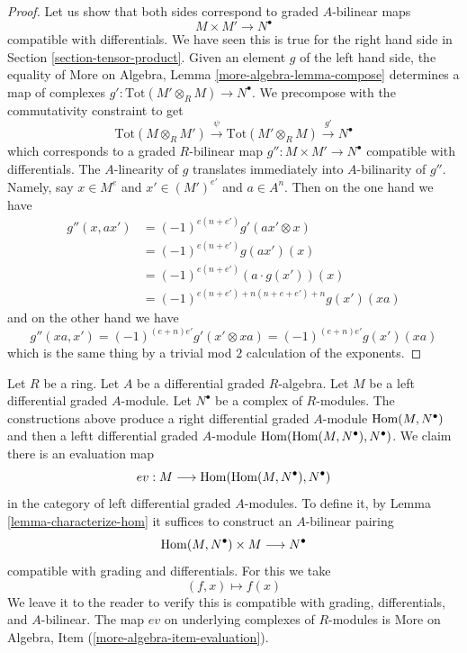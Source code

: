 \begin{proof}
Let us show that both sides correspond to graded $A$-bilinear maps
$$
M \times M' \longrightarrow N^\bullet
$$
compatible with differentials. We have seen this is true for the right
hand side in Section \ref{section-tensor-product}. Given an element
$g$ of the left hand side, the equality of
More on Algebra, Lemma \ref{more-algebra-lemma-compose}
determines a map of complexes
$g' : \text{Tot}(M' \otimes_R M) \to N^\bullet$.
We precompose with the commutativity constraint to get
$$
\text{Tot}(M \otimes_R M') \xrightarrow{\psi}
\text{Tot}(M' \otimes_R M) \xrightarrow{g'}
N^\bullet
$$
which corresponds to a graded $R$-bilinear
map $g'' : M \times M' \to N^\bullet$ compatible with differentials.
The $A$-linearity of $g$ translates immediately into $A$-bilinarity of $g''$.
Namely, say $x \in M^e$ and $x' \in (M')^{e'}$ and $a \in A^n$. Then
on the one hand we have
\begin{align*}
g''(x, ax')
& =
(-1)^{e(n + e')} g'(ax' \otimes x) \\
& =
(-1)^{e(n + e')} g(ax')(x) \\
& =
(-1)^{e(n + e')} (a \cdot g(x'))(x) \\
& =
(-1)^{e(n + e') + n(n + e + e') + n} g(x')(xa)
\end{align*}
and on the other hand we have
$$
g''(xa, x') = (-1)^{(e + n)e'} g'(x' \otimes xa) =
(-1)^{(e + n)e'} g(x')(xa) 
$$
which is the same thing by a trivial mod $2$ calculation of the exponents.
\end{proof}

\begin{remark}
\label{remark-evaluation-map-left}
Let $R$ be a ring. Let $A$ be a differential graded $R$-algebra.
Let $M$ be a left differential graded $A$-module. Let
$N^\bullet$ be a complex of $R$-modules. The constructions above
produce a right differential graded $A$-module $\mathop{\mathrm{Hom}}\nolimits(M, N^\bullet)$
and then a leftt differential graded $A$-module
$\mathop{\mathrm{Hom}}\nolimits(\mathop{\mathrm{Hom}}\nolimits(M, N^\bullet), N^\bullet)$. We claim there is an
evaluation map
$$
ev : M \longrightarrow \mathop{\mathrm{Hom}}\nolimits(\mathop{\mathrm{Hom}}\nolimits(M, N^\bullet), N^\bullet)
$$
in the category of left differential graded $A$-modules. To define it, by
Lemma \ref{lemma-characterize-hom} it suffices to construct an
$A$-bilinear pairing
$$
\mathop{\mathrm{Hom}}\nolimits(M, N^\bullet) \times M \longrightarrow N^\bullet
$$
compatible with grading and differentials. For this we take
$$
(f, x) \longmapsto f(x)
$$
We leave it to the reader to verify this is compatible with grading,
differentials, and $A$-bilinear. The map $ev$ on underlying complexes
of $R$-modules is More on Algebra, Item (\ref{more-algebra-item-evaluation}).
\end{remark}


